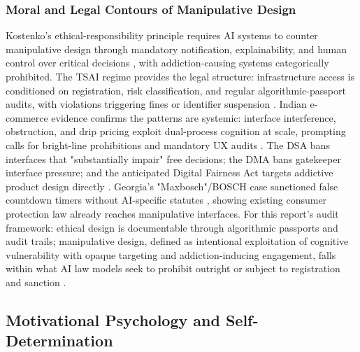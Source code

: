 \documentclass[11pt]{article}
\begin{document}
\subsubsection{Moral and Legal Contours of Manipulative Design}
\label{sec:moral_legal_manipulation} Kostenko's ethical-responsibility principle requires AI systems to counter manipulative design through mandatory notification, explainability, and human control over critical decisions \parencites[8]{2977039}[61--62]{2977039}, with addiction-causing systems categorically prohibited. The TSAI regime provides the legal structure: infrastructure access is conditioned on registration, risk classification, and regular algorithmic-passport audits, with violations triggering fines or identifier suspension \parencites[243]{2977039}[244]{2977039}. Indian e-commerce evidence confirms the patterns are systemic: interface interference, obstruction, and drip pricing exploit dual-process cognition at scale, prompting calls for bright-line prohibitions and mandatory UX audits \parencites[2]{6295677}[4]{6295677}[13]{6295677}. The DSA bans interfaces that "substantially impair" free decisions; the DMA bans gatekeeper interface pressure; and the anticipated Digital Fairness Act targets addictive product design directly \parencites[389]{7896734}[390]{7896734}. Georgia's "Maxbosch"/BOSCH case sanctioned false countdown timers without AI-specific statutes \parencites[390]{7896734}[391]{7896734}, showing existing consumer protection law already reaches manipulative interfaces. For this report's audit framework: ethical design is documentable through algorithmic passports and audit trails; manipulative design, defined as intentional exploitation of cognitive vulnerability with opaque targeting and addiction-inducing engagement, falls within what AI law models seek to prohibit outright or subject to registration and sanction \parencites[8]{2977039}[61--62]{2977039}[389]{7896734}[13]{6295677}.

\subsection{Motivational Psychology and Self-Determination}
\end{document}
